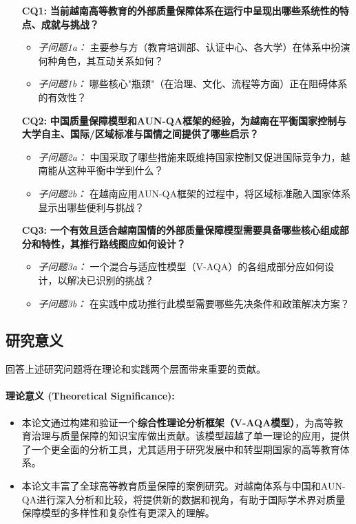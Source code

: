 \begin{enumerate}
    \item[\textbf{CQ1:}] \textbf{当前越南高等教育的外部质量保障体系在运行中呈现出哪些系统性的特点、成就与挑战？}
    \begin{itemize}
        \item \textit{子问题1a：} 主要参与方（教育培训部、认证中心、各大学）在体系中扮演何种角色，其互动关系如何？
        \item \textit{子问题1b：} 哪些核心"瓶颈"（在治理、文化、流程等方面）正在阻碍体系的有效性？
    \end{itemize}

    \item[\textbf{CQ2:}] \textbf{中国质量保障模型和AUN-QA框架的经验，为越南在平衡国家控制与大学自主、国际/区域标准与国情之间提供了哪些启示？}
    \begin{itemize}
        \item \textit{子问题2a：} 中国采取了哪些措施来既维持国家控制又促进国际竞争力，越南能从这种平衡中学到什么？
        \item \textit{子问题2b：} 在越南应用AUN-QA框架的过程中，将区域标准融入国家体系显示出哪些便利与挑战？
    \end{itemize}

    \item[\textbf{CQ3:}] \textbf{一个有效且适合越南国情的外部质量保障模型需要具备哪些核心组成部分和特性，其推行路线图应如何设计？}
    \begin{itemize}
        \item \textit{子问题3a：} 一个混合与适应性模型（V-AQA）的各组成部分应如何设计，以解决已识别的挑战？
        \item \textit{子问题3b：} 在实践中成功推行此模型需要哪些先决条件和政策解决方案？
    \end{itemize}
\end{enumerate}

\subsection{研究意义}
\label{subsec:y_nghia_nghien_cuu}

回答上述研究问题将在理论和实践两个层面带来重要的贡献。

\paragraph{理论意义 (Theoretical Significance):}
\begin{itemize}
    \item 本论文通过构建和验证一个\textbf{综合性理论分析框架（V-AQA模型）}，为高等教育治理与质量保障的知识宝库做出贡献。该模型超越了单一理论的应用，提供了一个更全面的分析工具，尤其适用于研究发展中和转型期国家的高等教育体系。
    \item 本论文丰富了全球高等教育质量保障的案例研究。对越南体系与中国和AUN-QA进行深入分析和比较，将提供新的数据和视角，有助于国际学术界对质量保障模型的多样性和复杂性有更深入的理解。
\end{itemize}

